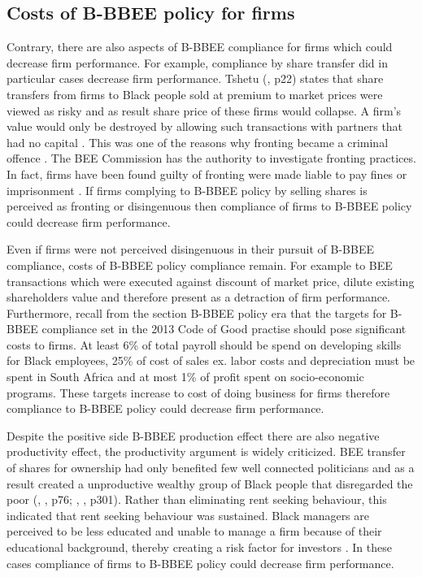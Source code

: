 \subsection{Costs of B-BBEE policy for firms}
Contrary, there are also aspects of B-BBEE compliance for firms which could decrease firm performance. For example, compliance by share transfer did in particular cases decrease firm performance. Tshetu (\citeyear{N6}, p22) states that share transfers from firms to Black people sold at premium to market prices were viewed as risky and as result share price of these firms would collapse. A firm’s value would only be destroyed by allowing such transactions with partners that had no capital \cite[p28]{N6}. This was one of the reasons why fronting became a criminal offence \cite[p18]{N4}. The BEE Commission has the authority to investigate fronting practices. In fact, firms have been found guilty of fronting were made liable to pay fines or imprisonment \cite[p20]{N41}. If firms complying to B-BBEE policy by selling shares is perceived as fronting or disingenuous then compliance of firms to B-BBEE policy could decrease firm performance.

Even if firms were not perceived disingenuous in their pursuit of B-BBEE compliance, costs of B-BBEE policy compliance remain. For example to BEE transactions which were executed against discount of market price, dilute existing shareholders value  and therefore present as a detraction of firm performance. Furthermore, recall from the section B-BBEE policy era that the targets for B-BBEE compliance set in the 2013 Code of Good practise should pose significant costs to firms. At least 6\% of total payroll should be spend on developing skills for Black employees, 25\% of cost of sales ex. labor costs and depreciation must be spent in South Africa and at most 1\% of profit spent on socio-economic programs. These targets increase to cost of doing business for firms therefore compliance to B-BBEE policy could decrease firm performance.

Despite the positive side B-BBEE production effect there are also negative productivity effect, the productivity argument is widely criticized. BEE transfer of shares for ownership had only benefited few well connected politicians and as a result created a unproductive wealthy group of Black people that disregarded the poor (\citeauthor{N6}, \citeyear{N6}, p76; \citeauthor{N30}, \citeyear{N30}, p301). Rather than eliminating rent seeking behaviour, this indicated that rent seeking behaviour was sustained. Black managers are perceived to be less educated and unable to manage a firm because of their educational background, thereby creating a risk factor for investors \cite[p10]{N24}. In these cases compliance of firms to B-BBEE policy could decrease firm performance.
